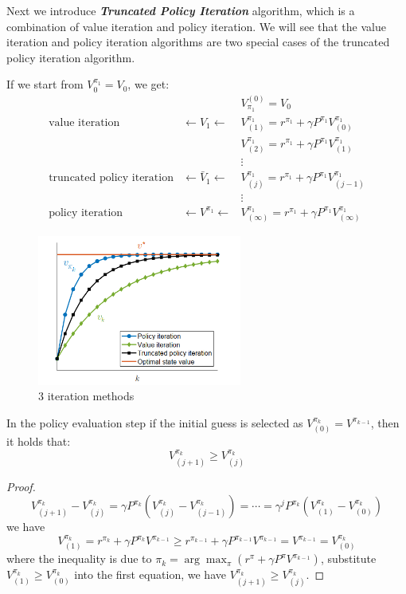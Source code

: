 \documentclass[10pt]{elegantbook}
\newcommand{\mydefination}[1]{\textbf{\textit{\textcolor{structurecolor}{#1}}}}
\begin{document}
Next we introduce \mydefination{Truncated Policy Iteration} algorithm, which is a combination of value iteration and policy iteration. We will
see that the value iteration and policy iteration algorithms are two special cases of the truncated policy iteration algorithm.

If we start from $V_0^{\pi_1} = V_0$, we get:
\[
\begin{array}{rll}
    && V^{(0)}_{\pi_1} = V_0 \\
    \text{value iteration} & \leftarrow V_1 \leftarrow & V_{(1)}^{\pi_1} = r^{\pi_1} + \gamma P^{\pi_1} V_{(0)}^{\pi_1} \\
    && V_{(2)}^{\pi_1} = r^{\pi_1} + \gamma P^{\pi_1} V_{(1)}^{\pi_1} \\
    && \vdots \\
    \text{truncated policy iteration} & \leftarrow \bar{V}_1 \leftarrow & V_{(j)}^{\pi_1} = r^{\pi_1} + \gamma P^{\pi_1} V_{(j-1)}^{\pi_1} \\
    && \vdots \\
    \text{policy iteration} & \leftarrow V^{\pi_1} \leftarrow & V_{(\infty)}^{\pi_1} = r^{\pi_1} + \gamma P^{\pi_1} V_{(\infty)}^{\pi_1}
\end{array}
\]

\begin{figure}[htbp]
    \centering
    \includegraphics[width=0.60\textwidth]{image/3_iteration.png}
    \caption{3 iteration methods}
    \label{fig:3_iteration}
\end{figure}

\begin{proposition}
    In the policy evaluation step if the initial guess is selected as $V^{\pi_k}_{(0)} = V^{\pi_{k-1}}$, then it holds that:
    \[ V^{\pi_k}_{(j+1)} \geq V^{\pi_k}_{(j)} \]
\end{proposition}

\begin{proof}
    \[ V^{\pi_k}_{(j+1)} - V^{\pi_k}_{(j)} = \gamma P^{\pi_k} (V^{\pi_k}_{(j)} - V^{\pi_k}_{(j-1)}) = \cdots = \gamma^j P^{\pi_k} (V^{\pi_k}_{(1)} - V^{\pi_k}_{(0)}) \]
    we have
    \[ V^{\pi_k}_{(1)} = r^{\pi_k} + \gamma P^{\pi_k} V^{\pi_{k-1}} \geq r^{\pi_{k-1}} + \gamma P^{\pi_{k-1}} V^{\pi_{k-1}} = V^{\pi_{k-1}} = V^{\pi_{k}}_{(0)} \]
    where the inequality is due to $\pi_k = \arg\max_{\pi} (r^{\pi} + \gamma P^{\pi} V^{\pi_{k-1}})$, substitute $V^{\pi_{k}}_{(1)} \geq V^{\pi_{k}}_{(0)}$ into 
    the first equation, we have $V^{\pi_k}_{(j+1)} \geq V^{\pi_k}_{(j)}$.
\end{proof}
\end{document}
